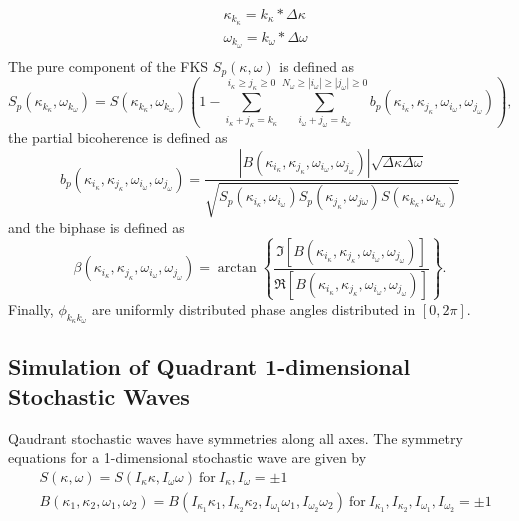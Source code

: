 \documentclass[preprint, review, 12pt]{elsarticle}
\begin{document}
\begin{equation}
\begin{aligned}
    & \kappa_{k_\kappa} = k_\kappa * \Delta \kappa \\
    & \omega_{k_\omega} = k_\omega * \Delta \omega \\
\end{aligned}
\end{equation}
The pure component of the FKS $S_p(\kappa, \omega)$ is defined as
\begin{equation}
    S_p(\kappa_{k_\kappa}, \omega_{k_\omega}) = S(\kappa_{k_\kappa}, \omega_{k_\omega})\left(1 - \sum_{i_\kappa + j_\kappa = k_\kappa }^{i_\kappa \geq j_\kappa \geq 0} \sum_{i_\omega + j_\omega = k_\omega}^{N_{\omega} \geq |i_\omega| \geq |j_\omega| \geq 0} b_{p}(\kappa_{i_\kappa}, \kappa_{j_\kappa}, \omega_{i_\omega}, \omega_{j_\omega}) \right),
    \label{eqn:pure}
\end{equation}
the partial bicoherence is defined as
\begin{equation}
    b_{p}(\kappa_{i_\kappa}, \kappa_{j_\kappa}, \omega_{i_\omega}, \omega_{j_\omega}) = \frac{|B(\kappa_{i_\kappa}, \kappa_{j_\kappa}, \omega_{i_\omega}, \omega_{j_\omega})|\sqrt{\Delta \kappa \Delta \omega}}{\sqrt{S_{p}(\kappa_{i_\kappa}, \omega_{i_\omega})S_{p}(\kappa_{j_\kappa}, \omega_{j\omega})S(\kappa_{k_\kappa}, \omega_{k_\omega})}}
\end{equation}
and the biphase is defined as
\begin{equation}
    \beta(\kappa_{i_\kappa}, \kappa_{j_\kappa}, \omega_{i_\omega}, \omega_{j_\omega}) = \arctan \left\{ \frac{\Im[B(\kappa_{i_\kappa}, \kappa_{j_\kappa}, \omega_{i_\omega}, \omega_{j_\omega})]}{\Re[B(\kappa_{i_\kappa}, \kappa_{j_\kappa}, \omega_{i_\omega}, \omega_{j_\omega})]} \right\}.
\end{equation}
Finally, $\phi_{k_\kappa k_\omega}$ are uniformly distributed phase angles distributed in $[0, 2\pi]$.

\subsection{Simulation of Quadrant 1-dimensional Stochastic Waves}

Qaudrant stochastic waves have symmetries along all axes. The symmetry equations for a 1-dimensional stochastic wave are given by
\begin{equation}
\begin{aligned}
	&S(\kappa, \omega) = S(I_{\kappa}\kappa, I_{\omega}\omega) \ \text{for} \ I_{\kappa},  I_{\omega} = \pm 1\\
	&B(\kappa_{1}, \kappa_{2}, \omega_{1}, \omega_{2}) = B(I_{\kappa_1}\kappa_{1}, I_{\kappa_2}\kappa_{2}, I_{\omega_1}\omega_{1}, I_{\omega_2}\omega_{2}) \ \text{for} \ I_{\kappa_1},  I_{\kappa_2}, I_{\omega_1}, I_{\omega_2} = \pm 1
\end{aligned}
\end{equation}
\end{document}
